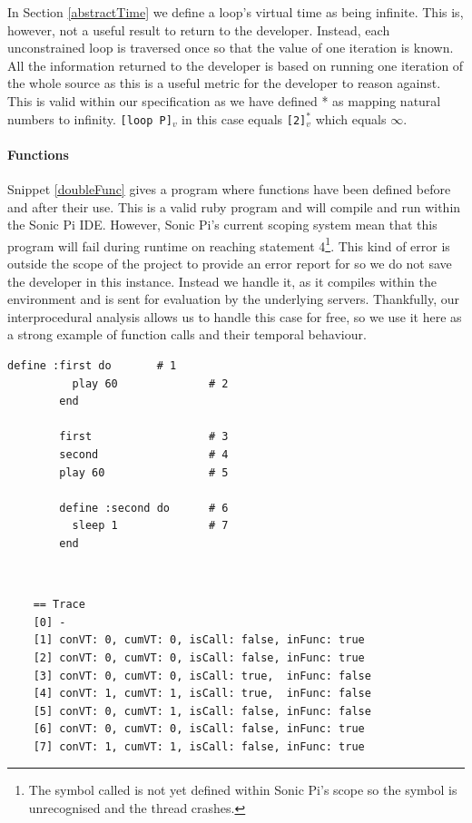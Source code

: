 \documentclass[11pt, abstracton, twoside, titlepage=true]{scrartcl}
\begin{document}
In Section \ref{abstractTime} we define a loop's virtual time as being infinite. 
This is, however, not a useful result to return to the developer. Instead, each 
unconstrained loop is traversed once so that the value of one iteration is known. 
All the information returned to the developer is based on running one iteration 
of the whole source as this is a useful metric for the developer to reason against. 
This is valid within our specification as we have defined * as mapping natural 
numbers to infinity. \texttt{[loop P]$_{v}$} in this case equals \texttt{[2]$_{v}^{*}$} 
which equals \texttt{$\infty$}.

\paragraph{Functions}
Snippet \ref{doubleFunc} gives a program where functions have been defined before 
and after their use. This is a valid ruby program and will compile and run within 
the Sonic Pi IDE. However, Sonic Pi's current scoping system mean that this program 
will fail during runtime on reaching statement 4\footnote{The symbol called is not 
yet defined within Sonic Pi's scope so the symbol is unrecognised and the thread 
crashes.}. This kind of error is outside the scope of the project to provide an error 
report for so we do not save the developer in this instance. Instead we handle it, 
as it compiles within the environment and is sent for evaluation by the underlying 
servers. Thankfully, our interprocedural analysis allows us to handle this case for 
free, so we use it here as a strong example of function calls and their temporal 
behaviour. 

\begin{minipage}{\textwidth}
	\begin{lstlisting}[style = sonicpi]
        define :first do       # 1
          play 60              # 2
        end
        
        first                  # 3
        second                 # 4
        play 60                # 5

        define :second do      # 6
          sleep 1              # 7
        end
	\end{lstlisting}
	 \label{doubleFunc}
\end{minipage}
\\
\begin{lstlisting}
    == Trace
    [0] -
    [1] conVT: 0, cumVT: 0, isCall: false, inFunc: true
    [2] conVT: 0, cumVT: 0, isCall: false, inFunc: true
    [3] conVT: 0, cumVT: 0, isCall: true,  inFunc: false
    [4] conVT: 1, cumVT: 1, isCall: true,  inFunc: false
    [5] conVT: 0, cumVT: 1, isCall: false, inFunc: false
    [6] conVT: 0, cumVT: 0, isCall: false, inFunc: true
    [7] conVT: 1, cumVT: 1, isCall: false, inFunc: true
\end{lstlisting}
\end{document}
